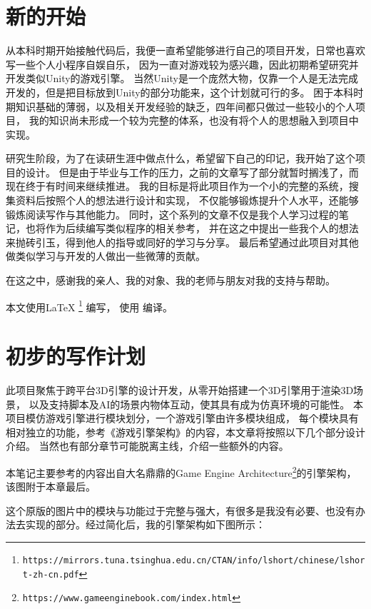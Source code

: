 \section{新的开始}

从本科时期开始接触代码后，我便一直希望能够进行自己的项目开发，日常也喜欢写一些个人小程序自娱自乐，
因为一直对游戏较为感兴趣，因此初期希望研究并开发类似Unity的游戏引擎。
当然Unity是一个庞然大物，仅靠一个人是无法完成开发的，但是把目标放到Unity的部分功能来，这个计划就可行的多。
困于本科时期知识基础的薄弱，以及相关开发经验的缺乏，四年间都只做过一些较小的个人项目，
我的知识尚未形成一个较为完整的体系，也没有将个人的思想融入到项目中实现。

研究生阶段，为了在读研生涯中做点什么，希望留下自己的印记，我开始了这个项目的设计。
但是由于毕业与工作的压力，之前的文章写了部分就暂时搁浅了，而现在终于有时间来继续推进。
我的目标是将此项目作为一个小的完整的系统，搜集资料后按照个人的想法进行设计和实现，
不仅能够锻炼提升个人水平，还能够锻炼阅读写作与其他能力。
同时，这个系列的文章不仅是我个人学习过程的笔记，也将作为后续编写类似程序的相关参考，
并在这之中提出一些我个人的想法来抛砖引玉，得到他人的指导或同好的学习与分享。
最后希望通过此项目对其他做类似学习与开发的人做出一些微薄的贡献。

在这之中，感谢我的亲人、我的对象、我的老师与朋友对我的支持与帮助。

本文使用\LaTeX{} \footnote{\nolinkurl{https://mirrors.tuna.tsinghua.edu.cn/CTAN/info/lshort/chinese/lshort-zh-cn.pdf}} 编写，
使用\XeLaTeX{} 编译。

\maketitle
\section{初步的写作计划}

此项目聚焦于跨平台3D引擎的设计开发，从零开始搭建一个3D引擎用于渲染3D场景，
以及支持脚本及AI的场景内物体互动，使其具有成为仿真环境的可能性。
本项目模仿游戏引擎进行模块划分，一个游戏引擎由许多模块组成，
每个模块具有相对独立的功能，参考《游戏引擎架构》的内容，本文章将按照以下几个部分设计介绍。
当然也有部分章节可能脱离主线，介绍一些额外的内容。

本笔记主要参考的内容出自大名鼎鼎的Game Engine Architecture\footnote{\nolinkurl{https://www.gameenginebook.com/index.html}}的引擎架构，
该图附于本章最后。

这个原版的图片中的模块与功能过于完整与强大，有很多是我没有必要、也没有办法去实现的部分。经过简化后，我的引擎架构如下图所示：

